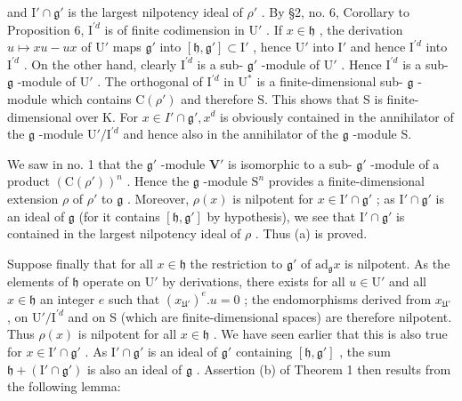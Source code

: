 and \(\mathrm{I}'\cap \mathfrak{g}'\) is the largest nilpotency ideal of \(\rho'\) . By §2, no. 6, Corollary to Proposition 6, \(\mathrm{I}^{\prime d}\) is of finite codimension in \(\mathrm{U}'\) . If \(x\in \mathfrak{h}\) , the derivation \(u\mapsto xu - ux\) of \(\mathrm{U}'\) maps \(\mathfrak{g}'\) into \([\mathfrak{h},\mathfrak{g}']\subset \mathrm{I}'\) , hence \(\mathrm{U}'\) into \(\mathrm{I}'\) and hence \(\mathrm{I}^{\prime d}\) into \(\mathrm{I}^{\prime d}\) . On the other hand, clearly \(\mathrm{I}^{\prime d}\) is a sub- \(\mathfrak{g}'\) -module of \(\mathrm{U}'\) . Hence \(\mathrm{I}^{\prime d}\) is a sub- \(\mathfrak{g}\) -module of \(\mathrm{U}'\) . The orthogonal of \(\mathrm{I}^{\prime d}\) in \(\mathrm{U}^*\) is a finite-dimensional sub- \(\mathfrak{g}\) -module which contains \(\mathrm{C}(\rho')\) and therefore S. This shows that S is finite-dimensional over K. For \(x\in I'\cap \mathfrak{g}', x^d\) is obviously contained in the annihilator of the \(\mathfrak{g}\) -module \(\mathrm{U}' / \mathrm{I}^{\prime d}\) and hence also in the annihilator of the \(\mathfrak{g}\) -module S.

We saw in no. 1 that the \(\mathfrak{g}'\) -module \(\mathbf{V}'\) is isomorphic to a sub- \(\mathfrak{g}'\) -module of a product \((\mathrm{C}(\rho'))^n\) . Hence the \(\mathfrak{g}\) -module \(\mathrm{S}^n\) provides a finite-dimensional extension \(\rho\) of \(\rho'\) to \(\mathfrak{g}\) . Moreover, \(\rho(x)\) is nilpotent for \(x \in \mathrm{I}' \cap \mathfrak{g}'\) ; as \(\mathrm{I}' \cap \mathfrak{g}'\) is an ideal of \(\mathfrak{g}\) (for it contains \([\mathfrak{h},\mathfrak{g}']\) by hypothesis), we see that \(\mathrm{I}'\cap \mathfrak{g}'\) is contained in the largest nilpotency ideal of \(\rho\) . Thus (a) is proved.

Suppose finally that for all \(x \in \mathfrak{h}\) the restriction to \(\mathfrak{g}'\) of \(\mathrm{ad}_{\mathfrak{g}}x\) is nilpotent. As the elements of \(\mathfrak{h}\) operate on \(\mathrm{U}'\) by derivations, there exists for all \(u \in \mathrm{U}'\) and all \(x \in \mathfrak{h}\) an integer \(e\) such that \((x_{\mathfrak{U}'})^e.u = 0\) ; the endomorphisms derived from \(x_{\mathfrak{U}'}\) , on \(\mathrm{U}' / \mathrm{I}^{\prime d}\) and on S (which are finite-dimensional spaces) are therefore nilpotent. Thus \(\rho(x)\) is nilpotent for all \(x \in \mathfrak{h}\) . We have seen earlier that this is also true for \(x \in \mathrm{I}' \cap \mathfrak{g}'\) . As \(\mathrm{I}' \cap \mathfrak{g}'\) is an ideal of \(\mathfrak{g}'\) containing \([\mathfrak{h}, \mathfrak{g}']\) , the sum \(\mathfrak{h} + (\mathrm{I}' \cap \mathfrak{g}')\) is also an ideal of \(\mathfrak{g}\) . Assertion (b) of Theorem 1 then results from the following lemma:

